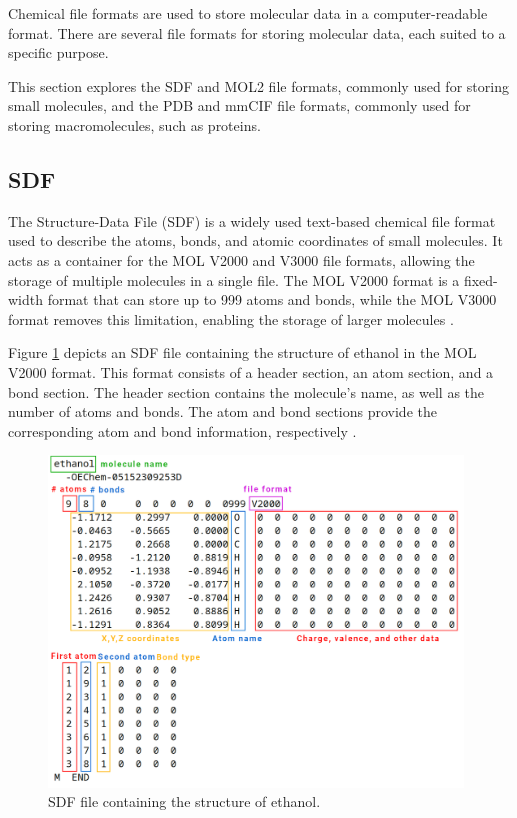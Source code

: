 \documentclass[
  digital,     %
  oneside,     %
  nosansbold,  %
  nocolorbold, %
  lof,         %
  lot,         %
]{fithesis4}
\begin{document}
Chemical file formats are used to store molecular data in a computer-readable format. There are several file formats for storing molecular data, each suited to a specific purpose.

This section explores the SDF and MOL2 file formats, commonly used for storing small molecules, and the PDB and mmCIF file formats, commonly used for storing macromolecules, such as proteins.

\subsection{SDF}
\label{subsection:sdf}

The Structure-Data File (SDF) is a widely used text-based chemical file format used to describe the atoms, bonds, and atomic coordinates of small molecules. It acts as a container for the MOL V2000 and V3000 file formats, allowing the storage of multiple molecules in a single file. The MOL V2000 format is a fixed-width format that can store up to 999 atoms and bonds, while the MOL V3000 format removes this limitation, enabling the storage of larger molecules \cite{mdl_ctfile,wikipedia_ctfile}.

Figure \ref{fig:sdf} depicts an SDF file containing the structure of ethanol in the MOL V2000 format. This format consists of a header section, an atom section, and a bond section. The header section contains the molecule's name, as well as the number of atoms and bonds. The atom and bond sections provide the corresponding atom and bond information, respectively \cite{belford2017anatomy}.

\begin{figure}[htbp]
  \begin{center}
    \includegraphics[width=11cm]{figures/sdf_file_format.png}
  \end{center}
  \caption[SDF file containing the structure of ethanol.]{SDF file containing the structure of ethanol. \cite{belford2017anatomy}}
  \label{fig:sdf}
\end{figure}
\end{document}
